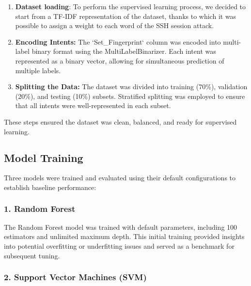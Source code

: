         \begin{enumerate}
        
            \item \textbf{Dataset loading}: To perform the supervised learning process, we decided to start from a TF-IDF representation of the dataset, thanks to which it was possible to assign a weight to each word of the SSH session attack.
            
            \item \textbf{Encoding Intents:} The `Set\_Fingerprint` column was encoded into multi-label binary format using the MultiLabelBinarizer. Each intent was represented as a binary vector, allowing for simultaneous prediction of multiple labels.
            
            \item \textbf{Splitting the Data:} The dataset was divided into training (70\%), validation (20\%), and testing (10\%) subsets. Stratified splitting was employed to ensure that all intents were well-represented in each subset.
        
        \end{enumerate}

        These steps ensured the dataset was clean, balanced, and ready for supervised learning.

    \subsection{Model Training}
    
        Three models were trained and evaluated using their default configurations to establish baseline performance:

        \subsubsection*{1. Random Forest \\}
        
        
            The Random Forest model was trained with default parameters, including 100 estimators and unlimited maximum depth. This initial training provided insights into potential overfitting or underfitting issues and served as a benchmark for subsequent tuning.

        \subsubsection*{2. Support Vector Machines (SVM) \\}
        
